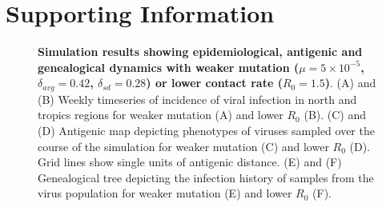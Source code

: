 \documentclass[11pt,oneside,letterpaper]{article}
\begin{document}



\pagebreak

\setcounter{figure}{0}
\setcounter{table}{0}
\setcounter{page}{1}
\renewcommand{\thefigure}{S\arabic{figure}}
\renewcommand{\thetable}{S\arabic{table}}
\renewcommand{\thepage}{S\arabic{page}}
  
\section*{Supporting Information}

\vspace*{\fill}
\begin{figure}[H]
	\centering
	\caption{\textbf{Simulation results showing epidemiological, antigenic and genealogical dynamics with weaker mutation ($\mu = 5 \times 10^{-5}$, $\delta_{avg} = 0.42$, $\delta_{sd} = 0.28$) or lower contact rate ($R_0 = 1.5$)}. (A) and (B) Weekly timeseries of incidence of viral infection in north and tropics regions for weaker mutation (A) and lower $R_0$ (B). (C) and (D) Antigenic map depicting phenotypes of viruses sampled over the course of the simulation for weaker mutation (C) and lower $R_0$ (D).  Grid lines show single units of antigenic distance. (E) and (F) Genealogical tree depicting the infection history of samples from the virus population for weaker mutation (E) and lower $R_0$ (F).}
	\label{h1n1}
\end{figure}
\vspace*{\fill}
\end{document}
